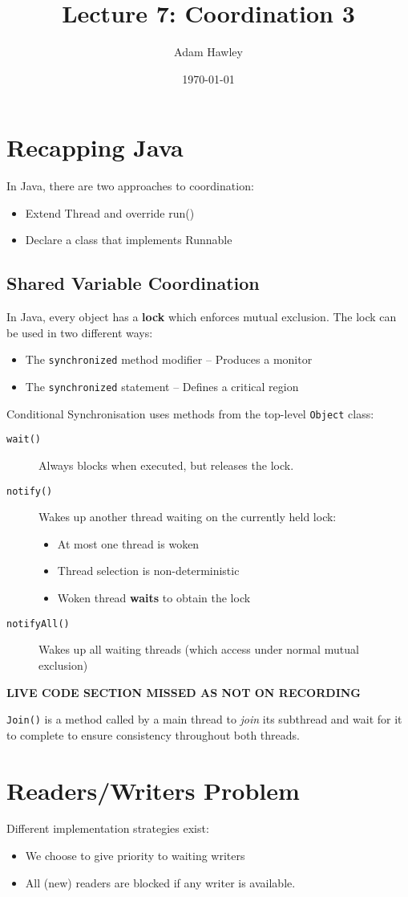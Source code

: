\documentclass[11pt]{article}
\author{Adam Hawley}
\date{\today}
\title{Lecture 7: Coordination 3}
\begin{document}
\maketitle
\tableofcontents


\section{Recapping Java}
\label{sec:org20921fc}
In Java, there are two approaches to coordination:
\begin{itemize}
\item Extend Thread and override run()
\item Declare a class that implements Runnable
\end{itemize}

\subsection{Shared Variable Coordination}
\label{sec:org78ecc99}
In Java, every object has a \textbf{lock} which enforces mutual exclusion.
The lock can be used in two different ways:
\begin{itemize}
\item The \texttt{synchronized} method modifier -- Produces a monitor
\item The \texttt{synchronized} statement -- Defines a critical region
\end{itemize}

Conditional Synchronisation uses methods from the top-level \texttt{Object} class:
\begin{description}
\item[{\texttt{wait()}}] Always blocks when executed, but releases the lock.
\item[{\texttt{notify()}}] Wakes up another thread waiting on the currently held lock:
\begin{itemize}
\item At most one thread is woken
\item Thread selection is non-deterministic
\item Woken thread \textbf{waits} to obtain the lock
\end{itemize}
\item[{\texttt{notifyAll()}}] Wakes up all waiting threads (which access under normal mutual exclusion)
\end{description}

\textbf{LIVE CODE SECTION MISSED AS NOT ON RECORDING} 

\texttt{Join()} is a method called by a main thread to \emph{join} its subthread and wait for it to complete to ensure consistency throughout both threads.

\section{Readers/Writers Problem}
\label{sec:org4df4cdb}
Different implementation strategies exist:
\begin{itemize}
\item We choose to give priority to waiting writers
\item All (new) readers are blocked if any writer is available.
\end{itemize}
\end{document}
